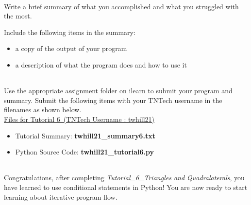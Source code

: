 \documentclass[12pt]{article}
\newcommand{\MNUM}{6} %
\newcommand{\TNAME}{Triangles and Quadralaterals} %
\begin{document}
\begin{description}[labelindent=1cm]
        \item[\textbf{\underline{Tutorial Summary:}}] \hfill \vspace{3mm}\\ 
        Write a brief summary of what you accomplished and what you struggled with the most. 

        Include the following items in the summary:
        \begin{itemize}

        \item a copy of the output of your program
        \item a description of what the program does and how to use it

        \end{itemize}


        \item[\textbf{\underline{Submission:}}] \hfill \vspace{3mm}\\ 
        Use the appropriate assignment folder on ilearn to submit your program and summary. Submit the following items with your TNTech username in the filenames as shown below. \vspace{0mm}\\

        \underline{Files for Tutorial \MNUM\ (TNTech Username : twhill21)}

        \begin{itemize}

        \item Tutorial Summary: \textbf{ twhill21\_summary\MNUM .txt}

        \item Python Source Code: \textbf{ twhill21\_tutorial\MNUM .py}

        \end{itemize}

        \item[\textbf{\underline{Tutorial Complete:}}] \hfill \vspace{3mm}\\ 
        Congratulations, after completing {\it Tutorial\_\MNUM\_\TNAME}, you have learned to use conditional statements in Python! You are now ready to start learning about iterative program flow. \\

    \end{description}
 
\end{document}
